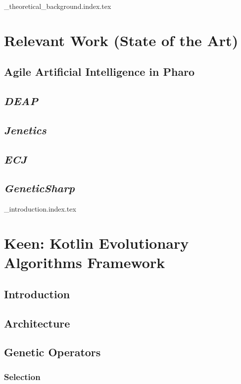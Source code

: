 {_theoretical_background.index.tex}

\chapter{Relevant Work (State of the Art)}
\label{chap:relevant_and_related_work}
  \section{Agile Artificial Intelligence in Pharo}
  \label{sec:agile_artificial_intelligence_in_pharo}
    \Blindtext
  \section{\textit{DEAP}}
  \label{sec:deap}
    \Blindtext
  \section{\textit{Jenetics}}
  \label{sec:jenetics}
    \Blindtext
  \section{\textit{ECJ}}
  \label{sec:ecj}
    \Blindtext
  \section{\textit{GeneticSharp}}
  \label{sec:geneticsharp}
    \Blindtext

{_introduction.index.tex}

\chapter{Keen: Kotlin Evolutionary Algorithms Framework}
\label{chap:keen}
  \section{Introduction}
  \label{sec:introduction}
    \Blindtext
  \section{Architecture}
  \label{sec:architecture}
    \Blindtext
  \section{Genetic Operators}
  \label{sec:keen:operators}
    \subsection{Selection}
    \label{sec:keen:operators:selection}
